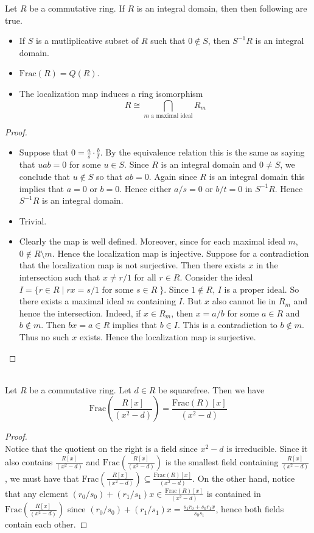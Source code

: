 \documentclass[a4paper]{article}
\begin{document}
\begin{lmm}{}{} Let $R$ be a commutative ring. If $R$ is an integral domain, then then following are true. 
\begin{itemize}
\item If $S$ is a mutliplicative subset of $R$ such that $0\notin S$, then $S^{-1}R$ is an integral domain. 
\item $\text{Frac}(R)=Q(R)$. 
\item The localization map induces a ring isomorphism $$R\cong\bigcap_{m\text{ a maximal ideal}}R_m$$
\end{itemize} 
\begin{proof}\\
\begin{itemize}
\item Suppose that $0=\frac{a}{s}\cdot\frac{b}{t}$. By the equivalence relation this is the same as saying that $uab=0$ for some $u\in S$. Since $R$ is an integral domain and $0\neq S$, we conclude that $u\notin S$ so that $ab=0$. Again since $R$ is an integral domain this implies that $a=0$ or $b=0$. Hence either $a/s=0$ or $b/t=0$ in $S^{-1}R$. Hence $S^{-1}R$ is an integral domain. 
\item Trivial. 
\item Clearly the map is well defined. Moreover, since for each maximal ideal $m$, $0\notin R\setminus m$. Hence the localization map is injective. Suppose for a contradiction that the localization map is not surjective. Then there exists $x$ in the intersection such that $x\neq r/1$ for all $r\in R$.  Consider the ideal $I=\{r\in R\;|\;rx=s/1\text{ for some }s\in R\;\}$. Since $1\notin R$, $I$ is a proper ideal. So there exists a maximal ideal $m$ containing $I$. But $x$ also cannot lie in $R_m$ and hence the intersection. Indeed, if $x\in R_m$, then $x=a/b$ for some $a\in R$ and $b\notin m$. Then $bx=a\in R$ implies that $b\in I$. This is a contradiction to $b\notin m$. Thus no such $x$ exists. Hence the localization map is surjective. 
\end{itemize}
\end{proof}
\end{lmm}

\begin{eg}{}{}\\
Let $R$ be a commutative ring. Let $d\in R$ be squarefree. Then we have $$\text{Frac}\left(\frac{R[x]}{(x^2-d)}\right)=\frac{\text{Frac}(R)[x]}{(x^2-d)}$$
\begin{proof}\\
Notice that the quotient on the right is a field since $x^2-d$ is irreducible. Since it also contains $\frac{R[x]}{(x^2-d)}$ and $\text{Frac}\left(\frac{R[x]}{(x^2-d)}\right)$ is the smallest field containing $\frac{R[x]}{(x^2-d)}$, we must have that $\text{Frac}\left(\frac{R[x]}{(x^2-d)}\right)\subseteq\frac{\text{Frac}(R)[x]}{(x^2-d)}$. On the other hand, notice that any element $(r_0/s_0)+(r_1/s_1)x\in\frac{\text{Frac}(R)[x]}{(x^2-d)}$ is contained in $\text{Frac}\left(\frac{R[x]}{(x^2-d)}\right)$ since $(r_0/s_0)+(r_1/s_1)x=\frac{s_1r_0+s_0r_1x}{s_0s_1}$, hence both fields contain each other. 
\end{proof}
\end{eg}
\end{document}
